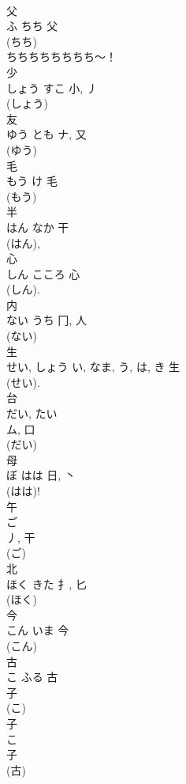 \documentclass[8pt]{extreport}
\begin{document}
\begin{CJK}{UTF8}{min}
\\	父	
\\	ふ	ちち	父	
\\	(ちち) 
\\	ちちちちちちちち〜！	
\\	少	
\\	しょう	すこ	小, 丿	
\\	(しょう) 
\\	友	
\\	ゆう	とも	ナ, 又	
\\	(ゆう)
\\	毛	
\\	もう	け	毛	
\\	(もう) 
\\	半	
\\	はん	なか	干		
\\	(はん), 
\\	心	
\\	しん	こころ	心	
\\	(しん).	
\\	内	
\\	ない	うち	冂, 人	
\\	(ない) 
\\	生	
\\	せい, しょう	い, なま, う, は, き	生	
\\	(せい). 
\\	台	
\\	だい, たい	
\\	ム, 口	
\\	(だい) 
\\	母	
\\	ぼ	はは	日, 丶	
\\	(はは)!
\\	午	
\\	ご	
\\	丿, 干	
\\	(ご) 
\\	北	
\\	ほく	きた	扌, 匕	
\\	(ほく) 
\\	今	
\\	こん	いま	今	
\\	(こん) 
\\	古	
\\	こ	ふる	古	
\\	子
\\	(こ) 
\\	子 
\\	こ 
\\	子 
\\	(古) 

\end{CJK}
\end{document}
